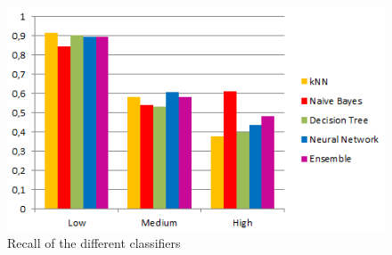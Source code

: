 \begin{figure}[H]
	\centering
	\includegraphics[width=\columnwidth]{../../charts/recall.png}
	\caption{Recall of the different classifiers}
	\label{fig:recall}
\end{figure}

